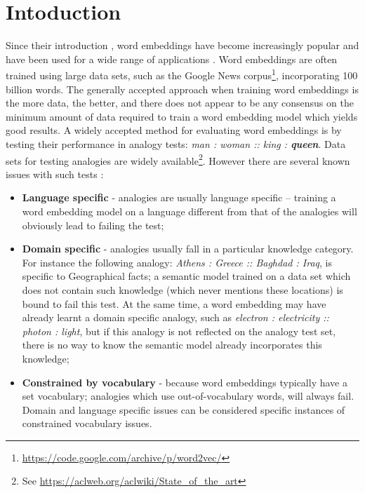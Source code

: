 \documentclass{article} %
\begin{document}
\section{Intoduction}
\label{sec:introduction}
Since their introduction \cite{Mikolov_CS2013}, word embeddings have become increasingly popular and have been used for a wide range of applications \cite{Mikolov_CoRR2013, Kim_CoRR2014, Levy_CNLL2014, Cordeiro_ACL2016, Smith_ICLR2017}. Word embeddings are often trained using large data sets, such as the Google News corpus\footnote{\url{https://code.google.com/archive/p/word2vec/}}, incorporating 100 billion words. The generally accepted approach when training word embeddings is the more data, the better, and there does not appear to be any consensus on the minimum amount of data required to train a word embedding model which yields good results. A widely accepted method for evaluating word embeddings is by testing their performance in analogy tests: \textit{man : woman :: king : \textbf{queen}}. Data sets for testing analogies are widely available\footnote{See \url{https://aclweb.org/aclwiki/State_of_the_art}}. However there are several known issues with such tests \cite{Speer_Blog2016}:

\begin{itemize}
 \item \textbf{Language specific} - analogies are usually language specific -- training a word embedding model on a language different from that of the analogies will obviously lead to failing the test;
 \item \textbf{Domain specific} - analogies usually fall in a particular knowledge category. For instance the following analogy: \textit{Athens : Greece :: Baghdad : Iraq}, is specific to Geographical facts; a semantic model trained on a data set which does not contain such knowledge (which never mentions these locations) is bound to fail this test. At the same time, a word embedding may have already learnt a domain specific analogy, such as \textit{electron : electricity :: photon : light}, but if this analogy is not reflected on the analogy test set, there is no way to know the semantic model already incorporates this knowledge;
 \item \textbf{Constrained by vocabulary} - because word embeddings typically have a set vocabulary; analogies which use out-of-vocabulary words, will always fail. Domain and language specific issues can be considered specific instances of constrained vocabulary issues.
\end{itemize}
\end{document}
